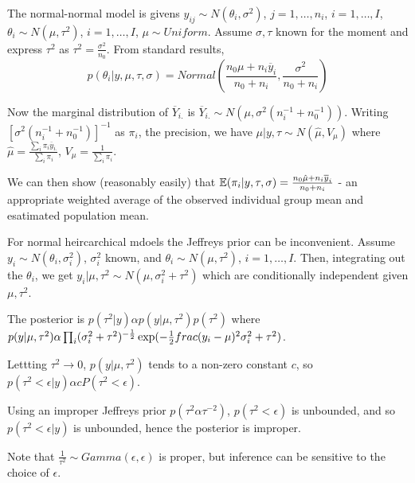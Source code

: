 \begin{defn}
  \label{sec:heirachcial-models-2}
  The normal-normal model is givens $y_{ij} \sim N(\theta_{i},
  \sigma^{2})$, $j = 1, \dots, n_{i}$, $i = 1, \dots, I$, $\theta_{i}
  \sim N(\mu, \tau^{2})$, $i = 1, \dots, I$, $\mu \sim Uniform$.
  Assume $\sigma, \tau$ known for the moment and express $\tau^{2}$
  as $\tau^{2} = \frac{\sigma^{2}}{n_{0}}$.  From standard results,
  \begin{equation}
    \label{eq:21}
    p(\theta_{i} | y, \mu, \tau, \sigma) = Normal(\frac{n_{0} \mu +
      n_{i} \overline y_{i}}{n_{0} + n_{i}}, \frac{\sigma^{2}}{n_{0} +
      n_{i}})
  \end{equation}

  Now the marginal distribution of $\overline Y_{i.}$ is $\overline
  Y_{i.} \sim N(\mu, \sigma^{2}(n_{i}^{-1} + n_{0}^{-1}))$.  Writing
  $[\sigma^{2}(n_{i}^{-1} + n_{0}^{-1})]^{-1}$ as $\pi_{i}$, the
  precision, we have $\mu | y, \tau \sim N(\hat \mu, V_{\mu})$ where
  $\hat \mu = \frac{\sum_{i}^{} \pi_{i} \overline y_{i.}}{\sum_{i}^{}
    \pi_{i}} $, $V_{\mu} = \frac{1}{\sum_{i}^{} \pi_{i}}$.

  We can then show (reasonably easily) that $\E{\pi_{i}| y, \tau,
    \sigma} = \frac{n_{0} \hat \mu + n_{i} \overline y_{i}}{n_{0} +
    n_{i}}$ - an appropriate weighted average of the observed
  individual group mean and esatimated population mean.
\end{defn}

\begin{defn}
  \label{sec:heirachcial-models-3}
  For normal heircarchical mdoels the Jeffreys prior can be
  inconvenient.  Assume $y_{i} \sim N(\theta_{i}, \sigma_{i}^{2})$,
  $\sigma_{i}^{2}$ known, and $\theta_{i} \sim N(\mu, \tau^{2})$, $i =
  1, \dots, I$.  Then, integrating out the $\theta_{i}$, we get $y_{i}
  | \mu, \tau^{2} \sim N(\mu, \sigma_{i}^{2} + \tau^{2})$ which are
  conditionally independent given $\mu, \tau^{2}$.

  The posterior is $p(\tau^{2} | y) \alpha p(y | \mu, \tau^{2})
  p(\tau^{2})$ where $p(y | \mu, \tau^{2}) \alpha \prod_{i}
  (\sigma_{i}^{2} + \tau^{2})^{-\frac{1}{2}} \exp(-\frac{1}{2}
  \\frac{(y_{i} - \mu)^{2}}{\sigma_{i}^{2} + \tau^{2}})$.

  Lettting $\tau^{2} \rightarrow 0$, $p(y | \mu, \tau^{2})$ tends to a
  non-zero constant $c$, so $p(\tau^{2} < \epsilon | y) \alpha
  cP(\tau^{2} < \epsilon)$.

  Using an improper Jeffreys prior $p(\tau^{2} \alpha \tau^{-2})$,
  $p(\tau^{2} < \epsilon)$ is unbounded, and so $p(\tau^{2} < \epsilon
  | y)$ is unbounded, hence the posterior is improper.  

  Note that $\frac{1}{\tau^{2}} \sim Gamma(\epsilon, \epsilon)$ is
  proper, but inference can be sensitive to the choice of $\epsilon$.
\end{defn}

